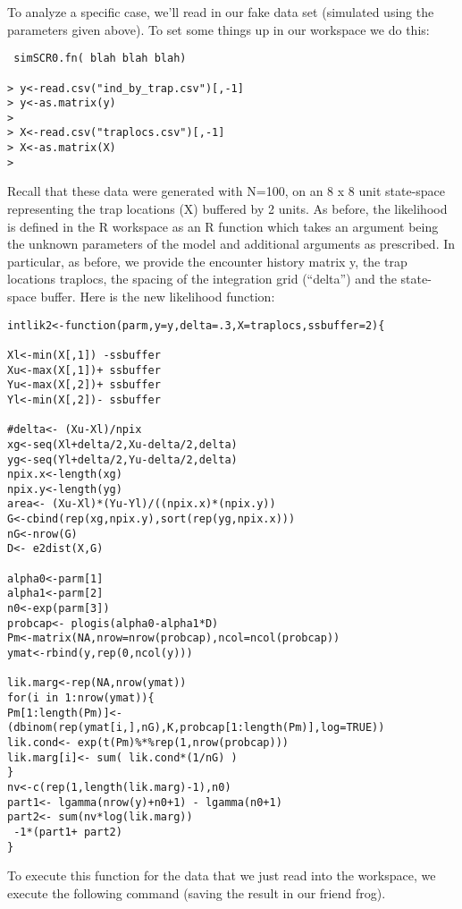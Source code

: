 To analyze a specific case, we’ll read in our fake data set (simulated
using the parameters given above). To set some things up in our
workspace we do this:

\begin{verbatim}
 simSCR0.fn( blah blah blah) 

> y<-read.csv("ind_by_trap.csv")[,-1]
> y<-as.matrix(y)
> 
> X<-read.csv("traplocs.csv")[,-1]
> X<-as.matrix(X)
> 

\end{verbatim}

Recall that these data were generated with N=100, on an 8 x 8 unit
state-space representing the trap locations (X) buffered by 2 units.
As before, the likelihood is defined in the R workspace as an R
function which takes an argument being the unknown parameters of the
model and additional arguments as prescribed. In particular, as
before, we provide the encounter history matrix y, the trap locations
traplocs, the spacing of the integration grid (“delta”) and the
state-space buffer. Here is the new likelihood function:

\begin{verbatim}
intlik2<-function(parm,y=y,delta=.3,X=traplocs,ssbuffer=2){

Xl<-min(X[,1]) -ssbuffer
Xu<-max(X[,1])+ ssbuffer
Yu<-max(X[,2])+ ssbuffer
Yl<-min(X[,2])- ssbuffer

#delta<- (Xu-Xl)/npix
xg<-seq(Xl+delta/2,Xu-delta/2,delta) 
yg<-seq(Yl+delta/2,Yu-delta/2,delta) 
npix.x<-length(xg)
npix.y<-length(yg)
area<- (Xu-Xl)*(Yu-Yl)/((npix.x)*(npix.y))
G<-cbind(rep(xg,npix.y),sort(rep(yg,npix.x)))
nG<-nrow(G)
D<- e2dist(X,G) 

alpha0<-parm[1]
alpha1<-parm[2]
n0<-exp(parm[3])
probcap<- plogis(alpha0-alpha1*D)
Pm<-matrix(NA,nrow=nrow(probcap),ncol=ncol(probcap))
ymat<-rbind(y,rep(0,ncol(y)))

lik.marg<-rep(NA,nrow(ymat))
for(i in 1:nrow(ymat)){
Pm[1:length(Pm)]<- (dbinom(rep(ymat[i,],nG),K,probcap[1:length(Pm)],log=TRUE))
lik.cond<- exp(t(Pm)%*%rep(1,nrow(probcap)))
lik.marg[i]<- sum( lik.cond*(1/nG) )  
}                                                 
nv<-c(rep(1,length(lik.marg)-1),n0)
part1<- lgamma(nrow(y)+n0+1) - lgamma(n0+1)
part2<- sum(nv*log(lik.marg))
 -1*(part1+ part2)
}
\end{verbatim}

To execute this function for the data that we just read into the
workspace, we execute the following command (saving the result in our
friend frog).

